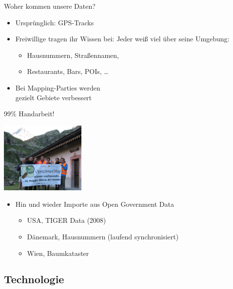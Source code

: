 \documentclass{beamer}
\begin{document}
\begin{frame}{Woher kommen unsere Daten?}

\begin{itemize}
  \item Ursprünglich: GPS-Tracks
  \item Freiwillige tragen ihr Wissen bei: Jeder weiß viel über seine Umgebung:
	\begin{itemize}
	  \item Hausnummern, Straßennamen,
	  \item Restaurants, Bars, POIs, \dots
  \end{itemize}
  \pause
  \item Bei Mapping-Parties werden \\ gezielt Gebiete verbessert
\end{itemize}

  \vspace{0.4cm}
 99\% Handarbeit!

  \vspace*{-2.9cm}
 \hfill \includegraphics[width=4.2cm]{alps_mp.jpg}


  \pause
\begin{itemize}
  \item Hin und wieder Importe aus Open Government Data
  \begin{itemize}
    \item USA, TIGER Data (2008)
    \item Dänemark, Hausnummern (laufend synchronisiert)
    \item Wien, Baumkataster
  \end{itemize}
\end{itemize}

\end{frame}

\subsection{Technologie}

\end{document}
